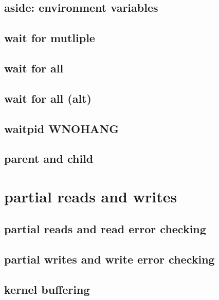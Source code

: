 




\subsection{aside: environment variables}


\subsection{wait for mutliple}
 

\subsection{wait for all}


\subsection{wait for all (alt)}


\subsection{waitpid WNOHANG}


\subsection{parent and child}




\section{partial reads and writes}
\subsection{partial reads and read error checking}

\subsection{partial writes and write error checking}


\subsection{kernel buffering}

